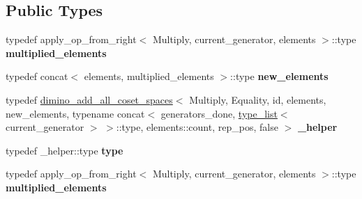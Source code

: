 \subsection*{Public Types}
\begin{DoxyCompactItemize}
\item 
\mbox{\label{struct_eigen_1_1internal_1_1group__theory_1_1dimino__add__generator_a17daad8c50569a8f3b2614893f3bbc61}} 
typedef apply\+\_\+op\+\_\+from\+\_\+right$<$ Multiply, current\+\_\+generator, elements $>$\+::type {\bfseries multiplied\+\_\+elements}
\item 
\mbox{\label{struct_eigen_1_1internal_1_1group__theory_1_1dimino__add__generator_a307476f5a85e93adf826cdb007246862}} 
typedef concat$<$ elements, multiplied\+\_\+elements $>$\+::type {\bfseries new\+\_\+elements}
\item 
\mbox{\label{struct_eigen_1_1internal_1_1group__theory_1_1dimino__add__generator_afe0cbd616ff11cc5d7144454985ac6c3}} 
typedef \hyperlink{struct_eigen_1_1internal_1_1group__theory_1_1dimino__add__all__coset__spaces}{dimino\+\_\+add\+\_\+all\+\_\+coset\+\_\+spaces}$<$ Multiply, Equality, id, elements, new\+\_\+elements, typename concat$<$ generators\+\_\+done, \hyperlink{struct_eigen_1_1internal_1_1type__list}{type\+\_\+list}$<$ current\+\_\+generator $>$ $>$\+::type, elements\+::count, rep\+\_\+pos, false $>$ {\bfseries \+\_\+helper}
\item 
\mbox{\label{struct_eigen_1_1internal_1_1group__theory_1_1dimino__add__generator_a5fa10aaef000f60fb08eeec36e97183b}} 
typedef \+\_\+helper\+::type {\bfseries type}
\item 
\mbox{\label{struct_eigen_1_1internal_1_1group__theory_1_1dimino__add__generator_a17daad8c50569a8f3b2614893f3bbc61}} 
typedef apply\+\_\+op\+\_\+from\+\_\+right$<$ Multiply, current\+\_\+generator, elements $>$\+::type {\bfseries multiplied\+\_\+elements}
\item 
\mbox{\label{struct_eigen_1_1internal_1_1group__theory_1_1dimino__add__generator_a307476f5a85e93adf826cdb007246862}} 

\end{DoxyCompactItemize}
